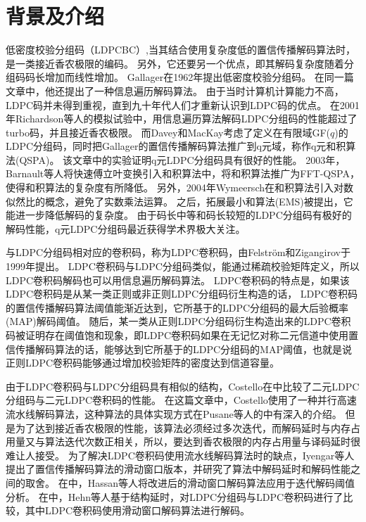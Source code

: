 \chapter{背景及介绍}
低密度校验分组码（LDPCBC）,当其结合使用复杂度低的置信传播解码算法时，是一类接近香农极限的编码。
另外，它还要另一个优点，即其解码复杂度随着分组码码长增加而线性增加。
Gallager在1962年提出低密度校验分组码\parencite{1057683}。
在同一篇文章中，他还提出了一种信息遍历解码算法。
由于当时计算机计算能力不高，LDPC码并未得到重视，直到九十年代人们才重新认识到LDPC码的优点。
在2001年Richardson等人的模拟试验中\parencite{910578}，用信息遍历算法解码LDPC分组码的性能超过了turbo码，并且接近香农极限。
而Davey和MacKay考虑了定义在有限域GF($q$)的LDPC分组码\parencite{681360}，同时把Gallager的置信传播解码算法推广到q元域，称作q元和积算法(QSPA)。
该文章中的实验证明q元LDPC分组码具有很好的性能。
2003年，Barnault等人将快速傅立叶变换引入和积算法中，将和积算法推广为FFT-QSPA，使得和积算法的复杂度有所降低\parencite{1216697}。
另外，2004年Wymeersch在和积算法引入对数似然比的概念，避免了实数乘法运算\parencite{1312606}。
之后，拓展最小和算法(EMS)被提出，它能进一步降低解码的复杂度。
由于码长中等和码长较短的LDPC分组码有极好的解码性能，q元LDPC分组码最近获得学术界极大关注。

与LDPC分组码相对应的卷积码，称为LDPC卷积码，由Felström和Zigangirov\parencite{782171}于1999年提出。
LDPC卷积码与LDPC分组码类似，能通过稀疏校验矩阵定义，所以LDPC卷积码解码也可以用信息遍历解码算法。
LDPC卷积码的特点是，如果该LDPC卷积码是从某一类正则或非正则LDPC分组码衍生构造的话，
LDPC卷积码的置信传播解码算法阈值能渐近达到，它所基于的LDPC分组码的最大后验概率(MAP)解码阈值\parencite{5695130}。
随后，某一类从正则LDPC分组码衍生构造出来的LDPC卷积码被证明存在阈值饱和现象，即LDPC卷积码如果在无记忆对称二元信道中使用置信传播解码算法的话，能够达到它所基于的LDPC分组码的MAP阈值，也就是说正则LDPC卷积码能够通过增加校验矩阵的密度达到信道容量。

由于LDPC卷积码与LDPC分组码具有相似的结构，Costello在\parencite{4357569}中比较了二元LDPC分组码与二元LDPC卷积码的性能。
在这篇文章中，Costello使用了一种并行高速流水线解码算法，这种算法的具体实现方式在Pusane等人的\parencite{4568447}中有深入的介绍。
但是为了达到接近香农极限的性能，该算法必须经过多次迭代，而解码延时与内存占用量又与算法迭代次数正相关，所以，要达到香农极限的内存占用量与译码延时很难让人接受。
为了解决LDPC卷积码使用流水线解码算法时的缺点，Iyengar等人提出了置信传播解码算法的滑动窗口版本\parencite{6086762}，并研究了算法中解码延时和解码性能之间的取舍。
在\parencite{6325232}中，Hassan等人将改进后的滑动窗口解码算法应用于迭代解码阈值分析。
在\parencite{5089507}中，Hehn等人基于结构延时，对LDPC分组码与LDPC卷积码进行了比较，其中LDPC卷积码使用滑动窗口解码算法进行解码。

